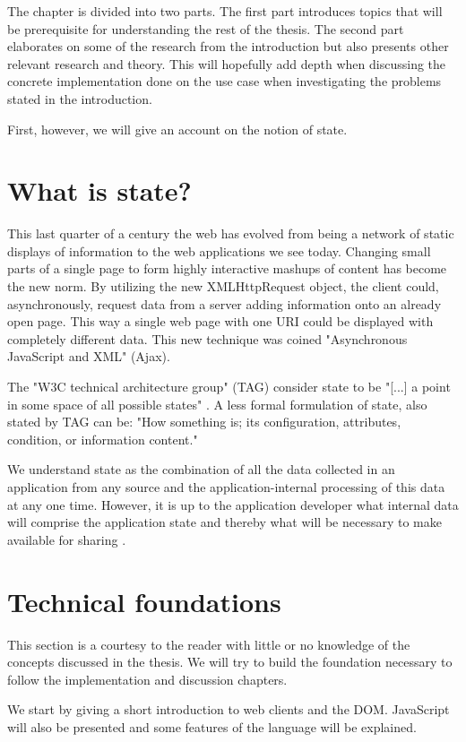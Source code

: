 \documentclass[english]{ifimaster}
\begin{document}
The chapter is divided into two parts. The first part introduces topics that will be prerequisite for understanding the rest of the thesis. The second part elaborates on some of the research from the introduction but also presents other relevant research and theory. This will hopefully add depth when discussing the concrete implementation done on the use case when investigating the problems stated in the introduction. 

First, however, we will give an account on the notion of state.

\section{What is state?}
\label{sec:state}
This last quarter of a century the web has evolved from being a network of static displays of information to the web applications we see today. Changing small parts of a single page to form highly interactive mashups of content has become the new norm. By utilizing the new XMLHttpRequest object, the client could, asynchronously, request data from a server adding information onto an already open page. This way a single web page with one URI could be displayed with completely different data. This new technique was coined "Asynchronous JavaScript and XML" (Ajax).

The "W3C technical architecture group" (TAG) consider state to be "[...] a point in some space of all possible states" \parencite{stateTAG}. A less formal formulation of state, also stated by TAG can be: "How something is; its configuration, attributes, condition, or information content." 

We understand state as the combination of all the data collected in an application from any source and the application-internal processing of this data at any one time. However, it is up to the application developer what internal data will comprise the application state and thereby what will be necessary to make available for sharing \parencite{foster}.

\section{Technical foundations}
This section is a courtesy to the reader with little or no knowledge of the concepts discussed in the thesis. We will try to build the foundation necessary to follow the implementation and discussion chapters. 

We start by giving a short introduction to web clients and the DOM. JavaScript will also be presented and some features of the language will be explained. 
\end{document}
